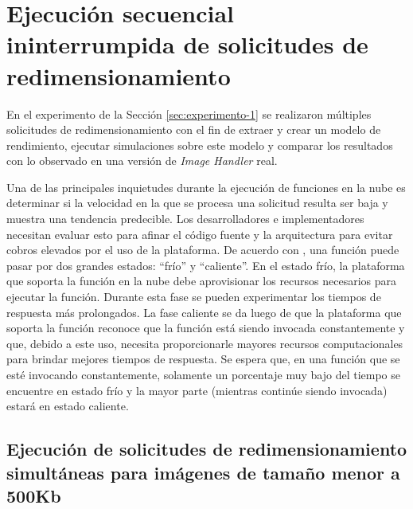 \newpage
\section{Ejecución secuencial ininterrumpida de solicitudes de redimensionamiento}\label{sec:experimento-2}

En el experimento de la Sección \ref{sec:experimento-1} se realizaron múltiples solicitudes de redimensionamiento con el fin de extraer y crear un modelo de rendimiento, ejecutar simulaciones sobre este modelo y comparar los resultados con lo observado en una versión de \emph{Image Handler} real.

Una de las principales inquietudes durante la ejecución de funciones en la nube es determinar si la velocidad en la que se procesa una solicitud resulta ser baja y muestra una tendencia predecible. Los desarrolladores e implementadores necesitan evaluar esto para afinar el código fuente y la arquitectura para evitar cobros elevados por el uso de la plataforma.
De acuerdo con \cite{8360324}, una función puede pasar por dos grandes estados: ``frío'' y ``caliente''. En el estado frío, la plataforma que soporta la función en la nube debe aprovisionar los recursos necesarios para ejecutar la función. Durante esta fase se pueden experimentar los tiempos de respuesta más prolongados. La fase caliente se da luego de que la plataforma que soporta la función reconoce que la función está siendo invocada constantemente y que, debido a este uso, necesita proporcionarle mayores recursos computacionales para brindar mejores tiempos de respuesta. Se espera que, en una función que se esté invocando constantemente, solamente un porcentaje muy bajo del tiempo se encuentre en estado frío y la mayor parte (mientras continúe siendo invocada) estará en estado caliente.

\newpage

\subsection{Ejecución de solicitudes de redimensionamiento simultáneas para imágenes de tamaño menor a 500Kb}


